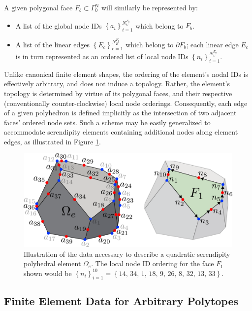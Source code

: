 	A given polygonal face $F_b \subset \Gamma^{\mathrm N}_0$ will similarly be represented by:
	\begin{itemize}
		\item A list of the global node IDs $\left\{ a_i \right\}_{i=1}^{N^{F_b}_V}$ which belong to $F_b$.
		\item A list of the linear edges $\left\{ E_{c} \right\}_{c=1}^{N^{F_b}_E}$ which belong to $\partial F_b$; each linear edge $E_c$ is in turn represented as an ordered list of local node IDs $\left\{ n_i \right\}_{i=1}^{N^{E_c}_V}$.
	\end{itemize}
	
	Unlike canonical finite element shapes, the ordering of the element's nodal IDs is effectively arbitrary, and does not induce a topology. Rather, the element's topology is determined by virtue of its polygonal faces, and their respective (conventionally counter-clockwise) local node orderings. Consequently, each edge of a given polyhedron is defined implicitly as the intersection of two adjacent faces' ordered node sets. Such a scheme may be easily generalized to accommodate serendipity elements containing additional nodes along element edges, as illustrated in Figure \ref{fig:polyhedron_data_quadratic}.
	\begin{figure} [!ht]
		\centering
		\includegraphics[width = 6.0in]{figures/polyhedron_data_quadratic.pdf}
		\caption{Illustration of the data necessary to describe a quadratic serendipity polyhedral element $\Omega_e$. The local node ID ordering for the face $F_1$ shown would be $\left\{ n_i \right\}_{i=1}^{10} = \left\{ 14, \, 34, \, 1, \, 18, \, 9, \, 26, \, 8, \, 32, \, 13, \, 33 \right\}$.}
		\label{fig:polyhedron_data_quadratic}
	\end{figure}
	
\subsection*{Finite Element Data for Arbitrary Polytopes}

